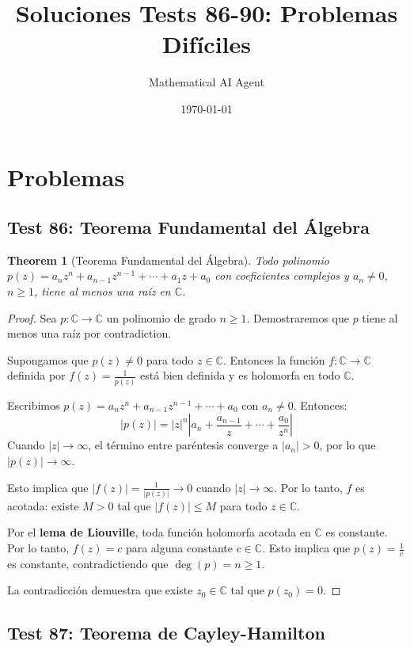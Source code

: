 \documentclass[11pt,a4paper]{article}
\title{Soluciones Tests 86-90: Problemas Difíciles}
\author{Mathematical AI Agent}
\date{\today}
\theoremstyle{plain}
\newtheorem{theorem}{Theorem}[section]
\theoremstyle{definition}
\begin{document}
\maketitle
\section{Problemas}

\subsection{Test 86: Teorema Fundamental del Álgebra}

\begin{theorem}[Teorema Fundamental del Álgebra]
Todo polinomio $p(z) = a_n z^n + a_{n-1} z^{n-1} + \cdots + a_1 z + a_0$ con coeficientes complejos y $a_n \neq 0$, $n \geq 1$, tiene al menos una raíz en $\mathbb{C}$.
\end{theorem}

\begin{proof}
Sea $p: \mathbb{C} \to \mathbb{C}$ un polinomio de grado $n \geq 1$. Demostraremos que $p$ tiene al menos una raíz por contradiction.

Supongamos que $p(z) \neq 0$ para todo $z \in \mathbb{C}$. Entonces la función $f: \mathbb{C} \to \mathbb{C}$ definida por $f(z) = \frac{1}{p(z)}$ está bien definida y es holomorfa en todo $\mathbb{C}$.

Escribimos $p(z) = a_n z^n + a_{n-1} z^{n-1} + \cdots + a_0$ con $a_n \neq 0$. Entonces:
\[
|p(z)| = |z|^n \left| a_n + \frac{a_{n-1}}{z} + \cdots + \frac{a_0}{z^n} \right|
\]
Cuando $|z| \to \infty$, el término entre paréntesis converge a $|a_n| > 0$, por lo que $|p(z)| \to \infty$.

Esto implica que $|f(z)| = \frac{1}{|p(z)|} \to 0$ cuando $|z| \to \infty$. Por lo tanto, $f$ es acotada: existe $M > 0$ tal que $|f(z)| \leq M$ para todo $z \in \mathbb{C}$.

Por el \textbf{lema de Liouville}, toda función holomorfa acotada en $\mathbb{C}$ es constante. Por lo tanto, $f(z) = c$ para alguna constante $c \in \mathbb{C}$. Esto implica que $p(z) = \frac{1}{c}$ es constante, contradictiendo que $\deg(p) = n \geq 1$.

La contradicción demuestra que existe $z_0 \in \mathbb{C}$ tal que $p(z_0) = 0$.
\end{proof}

\subsection{Test 87: Teorema de Cayley-Hamilton}
\end{document}
